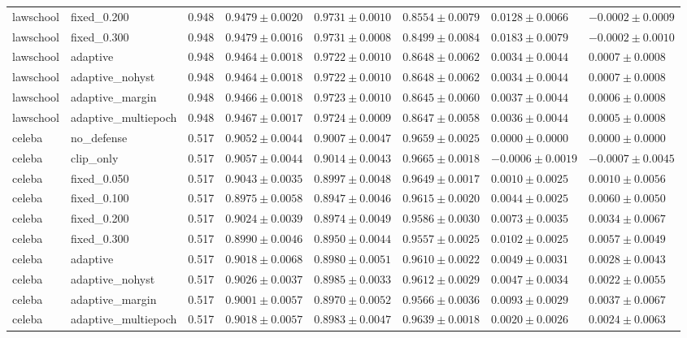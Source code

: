 \begin{table}[!t]
{\begin{tabular}{llllllll}
lawschool & fixed\_0.200 & 0.948 & $0.9479\pm0.0020$ & $0.9731\pm0.0010$ & $0.8554\pm0.0079$ & $0.0128\pm0.0066$ & $-0.0002\pm0.0009$ \\
lawschool & fixed\_0.300 & 0.948 & $0.9479\pm0.0016$ & $0.9731\pm0.0008$ & $0.8499\pm0.0084$ & $0.0183\pm0.0079$ & $-0.0002\pm0.0010$ \\
lawschool & adaptive & 0.948 & $0.9464\pm0.0018$ & $0.9722\pm0.0010$ & $0.8648\pm0.0062$ & $0.0034\pm0.0044$ & $0.0007\pm0.0008$ \\
lawschool & adaptive\_nohyst & 0.948 & $0.9464\pm0.0018$ & $0.9722\pm0.0010$ & $0.8648\pm0.0062$ & $0.0034\pm0.0044$ & $0.0007\pm0.0008$ \\
lawschool & adaptive\_margin & 0.948 & $0.9466\pm0.0018$ & $0.9723\pm0.0010$ & $0.8645\pm0.0060$ & $0.0037\pm0.0044$ & $0.0006\pm0.0008$ \\
lawschool & adaptive\_multiepoch & 0.948 & $0.9467\pm0.0017$ & $0.9724\pm0.0009$ & $0.8647\pm0.0058$ & $0.0036\pm0.0044$ & $0.0005\pm0.0008$ \\
celeba & no\_defense & 0.517 & $0.9052\pm0.0044$ & $0.9007\pm0.0047$ & $0.9659\pm0.0025$ & $0.0000\pm0.0000$ & $0.0000\pm0.0000$ \\
celeba & clip\_only & 0.517 & $0.9057\pm0.0044$ & $0.9014\pm0.0043$ & $0.9665\pm0.0018$ & $-0.0006\pm0.0019$ & $-0.0007\pm0.0045$ \\
celeba & fixed\_0.050 & 0.517 & $0.9043\pm0.0035$ & $0.8997\pm0.0048$ & $0.9649\pm0.0017$ & $0.0010\pm0.0025$ & $0.0010\pm0.0056$ \\
celeba & fixed\_0.100 & 0.517 & $0.8975\pm0.0058$ & $0.8947\pm0.0046$ & $0.9615\pm0.0020$ & $0.0044\pm0.0025$ & $0.0060\pm0.0050$ \\
celeba & fixed\_0.200 & 0.517 & $0.9024\pm0.0039$ & $0.8974\pm0.0049$ & $0.9586\pm0.0030$ & $0.0073\pm0.0035$ & $0.0034\pm0.0067$ \\
celeba & fixed\_0.300 & 0.517 & $0.8990\pm0.0046$ & $0.8950\pm0.0044$ & $0.9557\pm0.0025$ & $0.0102\pm0.0025$ & $0.0057\pm0.0049$ \\
celeba & adaptive & 0.517 & $0.9018\pm0.0068$ & $0.8980\pm0.0051$ & $0.9610\pm0.0022$ & $0.0049\pm0.0031$ & $0.0028\pm0.0043$ \\
celeba & adaptive\_nohyst & 0.517 & $0.9026\pm0.0037$ & $0.8985\pm0.0033$ & $0.9612\pm0.0029$ & $0.0047\pm0.0034$ & $0.0022\pm0.0055$ \\
celeba & adaptive\_margin & 0.517 & $0.9001\pm0.0057$ & $0.8970\pm0.0052$ & $0.9566\pm0.0036$ & $0.0093\pm0.0029$ & $0.0037\pm0.0067$ \\
celeba & adaptive\_multiepoch & 0.517 & $0.9018\pm0.0057$ & $0.8983\pm0.0047$ & $0.9639\pm0.0018$ & $0.0020\pm0.0026$ & $0.0024\pm0.0063$ \\
\hline
\end{tabular}
}
\end{table}